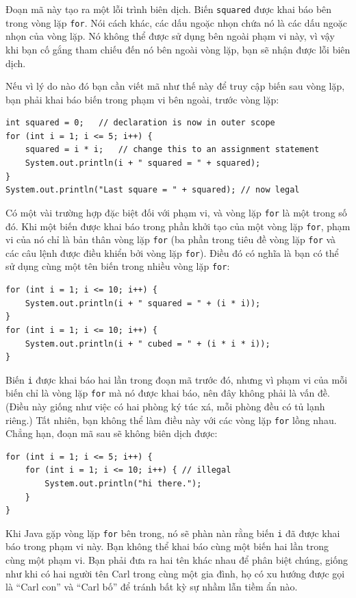 Đoạn mã này tạo ra một lỗi trình biên dịch. Biến \texttt{squared} được
khai báo bên trong vòng lặp \texttt{for}. Nói cách khác, các dấu ngoặc
nhọn chứa nó là các dấu ngoặc nhọn của vòng lặp. Nó không thể được sử
dụng bên ngoài phạm vi này, vì vậy khi bạn cố gắng tham chiếu đến nó bên
ngoài vòng lặp, bạn sẽ nhận được lỗi biên dịch.

Nếu vì lý do nào đó bạn cần viết mã như thế này để truy cập biến sau
vòng lặp, bạn phải khai báo biến trong phạm vi bên ngoài, trước vòng
lặp:

\begin{verbatim}
int squared = 0;   // declaration is now in outer scope
for (int i = 1; i <= 5; i++) {
    squared = i * i;   // change this to an assignment statement
    System.out.println(i + " squared = " + squared);
}
System.out.println("Last square = " + squared); // now legal
\end{verbatim}

Có một vài trường hợp đặc biệt đối với phạm vi, và vòng lặp \texttt{for}
là một trong số đó. Khi một biến được khai báo trong phần khởi tạo của
một vòng lặp \texttt{for}, phạm vi của nó chỉ là bản thân vòng lặp
\texttt{for} (ba phần trong tiêu đề vòng lặp \texttt{for} và các câu
lệnh được điều khiển bởi vòng lặp \texttt{for}). Điều đó có nghĩa là bạn
có thể sử dụng cùng một tên biến trong nhiều vòng lặp \texttt{for}:

\begin{verbatim}
for (int i = 1; i <= 10; i++) {
    System.out.println(i + " squared = " + (i * i));
}
for (int i = 1; i <= 10; i++) {
    System.out.println(i + " cubed = " + (i * i * i));
}
\end{verbatim}

Biến \texttt{i} được khai báo hai lần trong đoạn mã trước đó, nhưng vì
phạm vi của mỗi biến chỉ là vòng lặp \texttt{for} mà nó được khai báo,
nên đây không phải là vấn đề. (Điều này giống như việc có hai phòng ký
túc xá, mỗi phòng đều có tủ lạnh riêng.) Tất nhiên, bạn không thể làm
điều này với các vòng lặp \texttt{for} lồng nhau. Chẳng hạn, đoạn mã sau
sẽ không biên dịch được:

\begin{verbatim}
for (int i = 1; i <= 5; i++) {
    for (int i = 1; i <= 10; i++) { // illegal
        System.out.println("hi there.");
    }
}
\end{verbatim}

Khi Java gặp vòng lặp \texttt{for} bên trong, nó sẽ phàn nàn rằng biến
\texttt{i} đã được khai báo trong phạm vi này. Bạn không thể khai báo
cùng một biến hai lần trong cùng một phạm vi. Bạn phải đưa ra hai tên
khác nhau để phân biệt chúng, giống như khi có hai người tên Carl trong
cùng một gia đình, họ có xu hướng được gọi là ``Carl con'' và ``Carl
bố'' để tránh bất kỳ sự nhầm lẫn tiềm ẩn nào.

